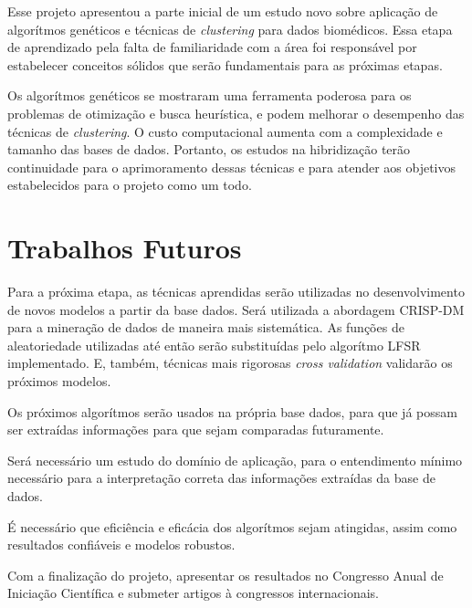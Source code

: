 
Esse projeto apresentou a parte inicial de um estudo novo sobre aplicação de algorítmos genéticos e técnicas de {\it clustering} para dados biomédicos. Essa etapa de aprendizado pela falta de familiaridade com a área foi responsável por estabelecer conceitos sólidos que serão fundamentais para as próximas etapas.

Os algorítmos genéticos se mostraram uma ferramenta poderosa para os problemas de otimização e busca heurística, e podem melhorar o desempenho das técnicas de {\it clustering}. O custo computacional aumenta com a complexidade e tamanho das bases de dados. Portanto, os estudos na hibridização terão continuidade para o aprimoramento dessas técnicas e para atender aos objetivos estabelecidos para o projeto como um todo.

\section{Trabalhos Futuros}
Para a próxima etapa, as técnicas aprendidas serão utilizadas no desenvolvimento de novos modelos a partir da base dados. Será utilizada a abordagem CRISP-DM para a mineração de dados de maneira mais sistemática. As funções de aleatoriedade utilizadas até então serão substituídas pelo algorítmo LFSR implementado. E, também, técnicas mais rigorosas {\it cross validation} validarão os próximos modelos.

Os próximos algorítmos serão usados na própria base dados, para que já possam ser extraídas informações para que sejam comparadas futuramente.

Será necessário um estudo do domínio de aplicação, para o entendimento mínimo necessário para a interpretação correta das informações extraídas da base de dados.

É necessário que eficiência e eficácia dos algorítmos sejam atingidas, assim como resultados confiáveis e modelos robustos.

Com a finalização do projeto, apresentar os resultados no Congresso Anual de Iniciação Científica e submeter artigos à congressos internacionais.

